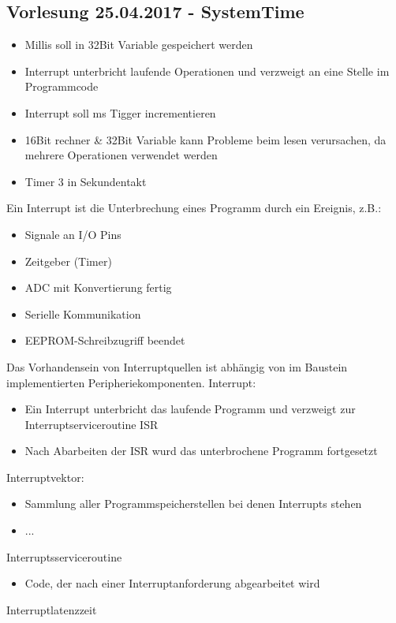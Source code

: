 \subsection{Vorlesung 25.04.2017 - SystemTime}

\begin{itemize}%
	\item Millis soll in 32Bit Variable gespeichert werden
	\item Interrupt unterbricht laufende Operationen und verzweigt an eine Stelle im Programmcode
	\item Interrupt soll ms Tigger incrementieren
	\item 16Bit rechner \& 32Bit Variable kann Probleme beim lesen verursachen, da mehrere Operationen verwendet werden
	\item Timer 3 in Sekundentakt
\end{itemize}
Ein Interrupt ist die Unterbrechung eines Programm durch ein Ereignis, z.B.:
\begin{itemize}
	\item Signale an I/O Pins
	\item Zeitgeber (Timer)
	\item ADC mit Konvertierung fertig
	\item Serielle Kommunikation
	\item EEPROM-Schreibzugriff beendet
\end{itemize}
Das Vorhandensein von Interruptquellen ist abhängig von im Baustein implementierten Peripheriekomponenten.\newline\newline
Interrupt:
\begin{itemize}
	\item Ein Interrupt unterbricht das laufende Programm und verzweigt zur Interruptserviceroutine ISR
	\item Nach Abarbeiten der ISR wurd das unterbrochene Programm fortgesetzt
\end{itemize}
%
Interruptvektor:
\begin{itemize}
	\item Sammlung aller Programmspeicherstellen bei denen Interrupts stehen
	\item ...
\end{itemize}
%
Interruptsserviceroutine
\begin{itemize}
	\item Code, der nach einer Interruptanforderung abgearbeitet wird
\end{itemize}
%
Interruptlatenzzeit
